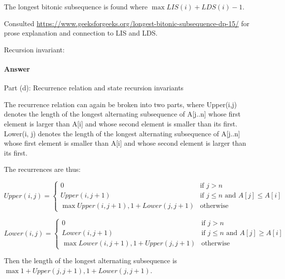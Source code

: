 \documentclass{article}
\begin{document}
The longest bitonic subsequence is found where $\max{LIS(i)+LDS(i)-1}$.

Consulted \url{https://www.geeksforgeeks.org/longest-bitonic-subsequence-dp-15/}  for prose explanation and connection to LIS and LDS. 

Recursion invariant: \todo{}

\paragraph{Answer}{Part (d): Recurrence relation and state recursion invariants}

The recurrence relation can again be broken into two parts, where Upper(i,j) denotes the length of the longest alternating subsequence of A[j..n] whose first element is larger than A[i] and whose second element is smaller than its first. Lower(i, j) denotes the length of the longest alternating subsequence of A[j..n] whose first element is smaller than A[i] and whose second element is larger than its first. 

The recurrences are thus: 

\begin{equation}
Upper(i,j) = 
\begin{cases}
0 & \text{if $j > n$}\\
Upper(i, j+1) & \text{if $j \leq n$ and $A[j] \leq A[i]$}\\
\max{Upper(i, j+1), 1 + Lower(j, j+1)} & \text{otherwise}
\end{cases}
\end{equation}

\begin{equation}
Lower(i,j) = 
\begin{cases}
0 & \text{if $j > n$}\\
Lower(i, j+1) & \text{if $j \leq n$ and $A[j] \geq A[i]$}\\
\max{Lower(i, j+1), 1 + Upper(j, j+1)} & \text{otherwise}
\end{cases}
\end{equation}

Then the length of the longest alternating subsequence is $\max{1 + Upper(j, j+1), 1 + Lower(j, j+1)}$.
\end{document}
